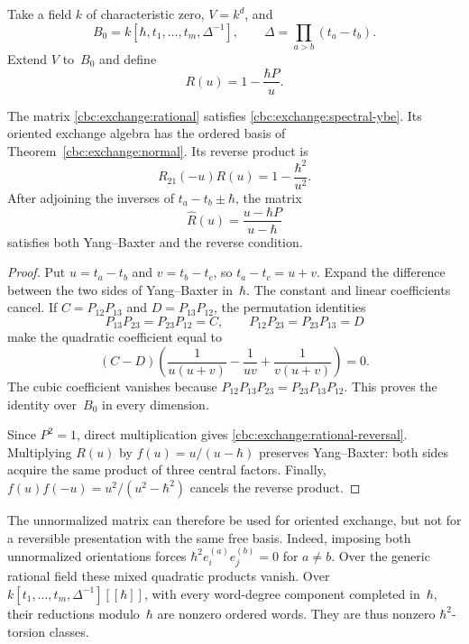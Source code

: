Take a field $k$ of characteristic zero, $V=k^d$, and
\[
 B_0=k[\hbar,t_1,\ldots,t_m,\Delta^{-1}],\qquad
 \Delta=\prod_{a>b}(t_a-t_b).
\]
Extend $V$ to~$B_0$ and define
\begin{equation}\label{cbc:exchange:rational}
 R(u)=1-\frac{\hbar P}{u}.
\end{equation}
\begin{proposition}\label{cbc:exchange:rational-result}
The matrix \eqref{cbc:exchange:rational} satisfies
\eqref{cbc:exchange:spectral-ybe}.  Its oriented exchange algebra has the
ordered basis of Theorem~\ref{cbc:exchange:normal}.  Its reverse product is
\begin{equation}\label{cbc:exchange:rational-reversal}
 R_{21}(-u)R(u)=1-\frac{\hbar^2}{u^2}.
\end{equation}
After adjoining the inverses of $t_a-t_b\pm\hbar$, the matrix
\begin{equation}\label{cbc:exchange:normalized}
 \widehat R(u)=\frac{u-\hbar P}{u-\hbar}
\end{equation}
satisfies both Yang--Baxter and the reverse condition.
\end{proposition}
\begin{proof}
Put $u=t_a-t_b$ and $v=t_b-t_c$, so $t_a-t_c=u+v$.
Expand the difference between the two sides of Yang--Baxter in~$\hbar$.
The constant and linear coefficients cancel.  If
$C=P_{12}P_{13}$ and $D=P_{13}P_{12}$, the permutation identities
\[
 P_{13}P_{23}=P_{23}P_{12}=C,\qquad
 P_{12}P_{23}=P_{23}P_{13}=D
\]
make the quadratic coefficient equal to
\[
 (C-D)\left(\frac1{u(u+v)}-\frac1{uv}
                         +\frac1{v(u+v)}\right)=0.
\]
The cubic coefficient vanishes because
$P_{12}P_{13}P_{23}=P_{23}P_{13}P_{12}$.
This proves the identity over~$B_0$ in every dimension.

Since $P^2=1$, direct multiplication gives
\eqref{cbc:exchange:rational-reversal}.
Multiplying $R(u)$ by $f(u)=u/(u-\hbar)$ preserves Yang--Baxter:
both sides acquire the same product of three central factors.
Finally,
$f(u)f(-u)=u^2/(u^2-\hbar^2)$ cancels the reverse product.
\end{proof}

The unnormalized matrix can therefore be used for oriented exchange,
but not for a reversible presentation with the same free basis.
Indeed, imposing both unnormalized orientations forces
$\hbar^2 e_i^{(a)}e_j^{(b)}=0$ for $a\ne b$.
Over the generic rational field these mixed quadratic products vanish.
Over $k[t_1,\ldots,t_m,\Delta^{-1}][[\hbar]]$, with every word-degree
component completed in~$\hbar$, their reductions modulo~$\hbar$ are
nonzero ordered words.  They are thus nonzero $\hbar^2$-torsion classes.

